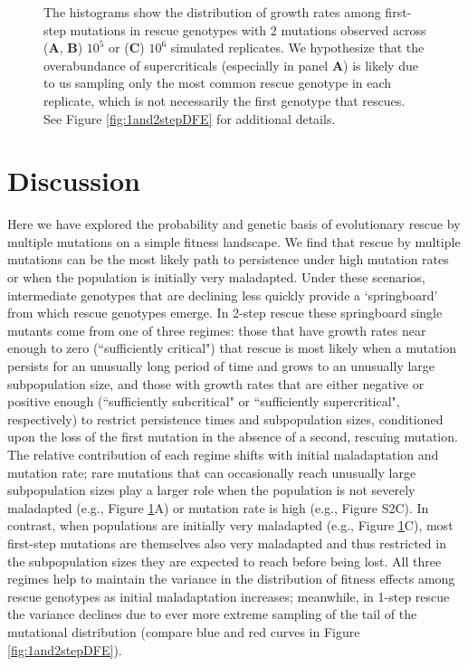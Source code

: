 \documentclass[9pt,twocolumn,twoside,lineno]{gsajnl}
\begin{document}
\begin{figure}[htbp]
{The histograms show the distribution of growth rates among first-step mutations in rescue genotypes with 2 mutations observed across (\textbf{A}, \textbf{B}) $10^5$ or (\textbf{C}) $10^6$ simulated replicates.
We hypothesize that the overabundance of supercriticals (especially in panel \textbf{A}) is likely due to us sampling only the most common rescue genotype in each replicate, which is not necessarily the first genotype that rescues.
See Figure \ref{fig:1and2stepDFE} for additional details.
}%
\label{fig:2stepDFE}
\end{figure}

\section{Discussion}
\label{sec:discussion}

Here we have explored the probability and genetic basis of evolutionary rescue by multiple mutations on a simple fitness landscape. 
We find that rescue by multiple mutations can be the most likely path to persistence under high mutation rates or when the population is initially very maladapted.
Under these scenarios, intermediate genotypes that are declining less quickly provide a `springboard' from which rescue genotypes emerge.
In 2-step rescue these springboard single mutants come from one of three regimes: those that have growth rates near enough to zero (``sufficiently critical") that rescue is most likely when a mutation persists for an unusually long period of time and grows to an unusually large subpopulation size, and those with growth rates that are either negative or positive enough (``sufficiently subcritical" or ``sufficiently supercritical", respectively) to restrict persistence times and subpopulation sizes, conditioned upon the loss of the first mutation in the absence of a second, rescuing mutation.
The relative contribution of each regime shifts with initial maladaptation and mutation rate; rare mutations that can occasionally reach unusually large subpopulation sizes play a larger role when the population is not severely maladapted (e.g., Figure \ref{fig:2stepDFE}A) or mutation rate is high (e.g., Figure S2C).
In contrast, when populations are initially very maladapted (e.g., Figure \ref{fig:2stepDFE}C), most first-step mutations are themselves also very maladapted and thus restricted in the subpopulation sizes they are expected to reach before being lost.     
All three regimes help to maintain the variance in the distribution of fitness effects among rescue genotypes as initial maladaptation increases; meanwhile, in 1-step rescue the variance declines due to ever more extreme sampling of the tail of the mutational distribution (compare blue and red curves in Figure \ref{fig:1and2stepDFE}).
\end{document}
